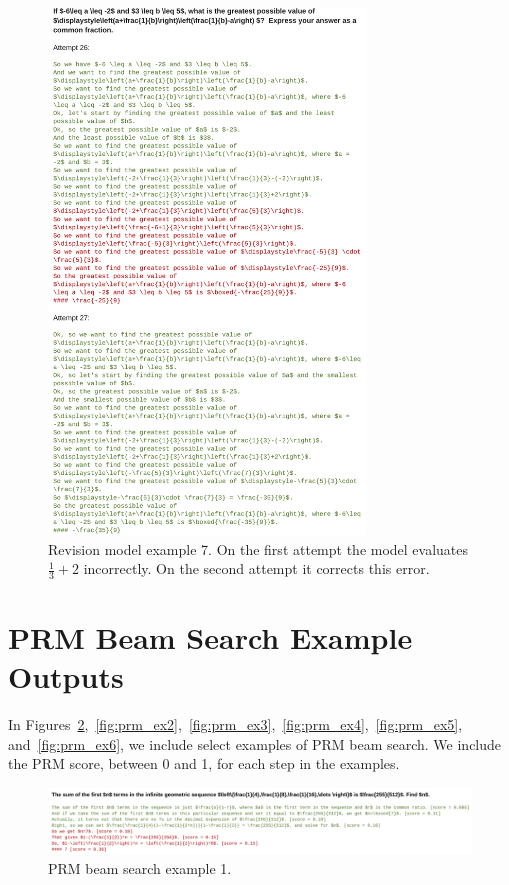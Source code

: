 \documentclass[11pt, letterpaper, logo]{googledeepmind}
\begin{document}
\begin{figure}
    \centering
    \includegraphics[width=0.75\textwidth]{revisions_ex7.png}
    \caption{Revision model example 7. On the first attempt the model evaluates $\frac{1}{3}+2$ incorrectly. On the second attempt it corrects this error.}
    \label{fig:revisions_ex7}
\end{figure}

\section{PRM Beam Search Example Outputs}
\label{app:prm_example_outputs}

In Figures~\ref{fig:prm_ex1},~\ref{fig:prm_ex2},~\ref{fig:prm_ex3},~\ref{fig:prm_ex4},~\ref{fig:prm_ex5}, and~\ref{fig:prm_ex6}, we include select examples of PRM beam search. We include the PRM score, between 0 and 1, for each step in the examples.

\begin{figure}
    \centering
    \includegraphics[width=1.0\textwidth]{PRM_ex1.png}
    \caption{PRM beam search example 1.}
    \label{fig:prm_ex1}
\end{figure}
\end{document}
